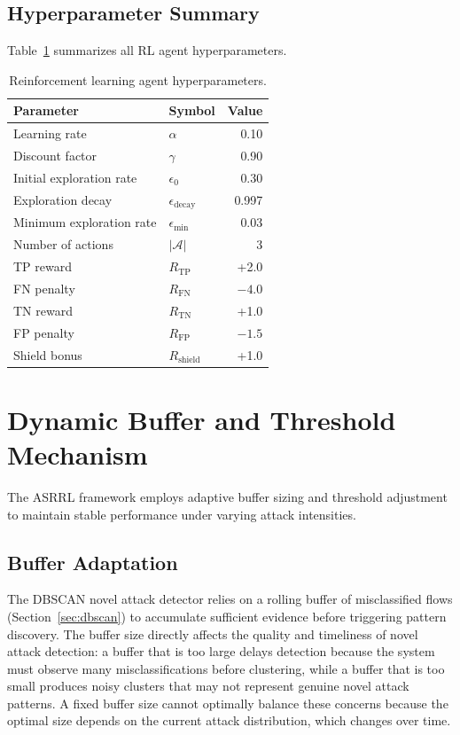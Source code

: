 \documentclass[12pt, letterpaper, oneside]{report}
\newcommand{\ASRRL}{\textsc{ASRRL}}
\begin{document}
\subsection{Hyperparameter Summary}

Table~\ref{tab:rl_hyperparams} summarizes all RL agent hyperparameters.

\begin{table}[htbp]
\centering
\caption{Reinforcement learning agent hyperparameters.}
\label{tab:rl_hyperparams}
\small
\begin{tabular}{llr}
\toprule
\textbf{Parameter} & \textbf{Symbol} & \textbf{Value} \\
\midrule
Learning rate & $\alpha$ & 0.10 \\
Discount factor & $\gamma$ & 0.90 \\
Initial exploration rate & $\epsilon_0$ & 0.30 \\
Exploration decay & $\epsilon_{\text{decay}}$ & 0.997 \\
Minimum exploration rate & $\epsilon_{\min}$ & 0.03 \\
Number of actions & $|\mathcal{A}|$ & 3 \\
TP reward & $R_{\text{TP}}$ & +2.0 \\
FN penalty & $R_{\text{FN}}$ & $-4.0$ \\
TN reward & $R_{\text{TN}}$ & +1.0 \\
FP penalty & $R_{\text{FP}}$ & $-1.5$ \\
Shield bonus & $R_{\text{shield}}$ & +1.0 \\
\bottomrule
\end{tabular}
\end{table}


\section{Dynamic Buffer and Threshold Mechanism}
\label{sec:dynamic_buffer}

The \ASRRL{} framework employs adaptive buffer sizing and threshold adjustment to maintain stable performance under varying attack intensities.

\subsection{Buffer Adaptation}

The DBSCAN novel attack detector relies on a rolling buffer of misclassified flows (Section~\ref{sec:dbscan}) to accumulate sufficient evidence before triggering pattern discovery. The buffer size directly affects the quality and timeliness of novel attack detection: a buffer that is too large delays detection because the system must observe many misclassifications before clustering, while a buffer that is too small produces noisy clusters that may not represent genuine novel attack patterns. A fixed buffer size cannot optimally balance these concerns because the optimal size depends on the current attack distribution, which changes over time.
\end{document}

